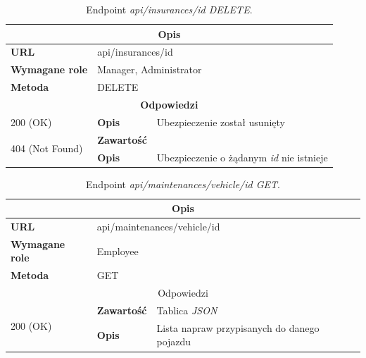 \documentclass[eng,printmode,openany]{mgr}
\begin{document}
\begin{table}[H]
	\caption{Endpoint \textit{api/insurances/id DELETE}.}
	\begin{tabularx}{\textwidth}{|l|l|X|}
		\hline
		\multicolumn{3}{|c|}{\textbf{\textbf{Opis}}}
		\\ \hline
		\textbf{URL}                       & \multicolumn{2}{l|}{api/insurances/id}
		\\ \hline
		\textbf{Wymagane role}             & \multicolumn{2}{l|}{Manager, Administrator}
		\\ \hline
		\textbf{Metoda}                    & \multicolumn{2}{l|}{DELETE}
		\\ \hline
		\multicolumn{3}{|c|}{\textbf{Odpowiedzi}}
		\\ \hline
		200 (OK)			                & \textbf{Opis}         	& Ubezpieczenie został usunięty
		\\ \hline
		\multirow{2}{*}{404 (Not Found)} 	& \textbf{Zawartość}     & 
		\\ \cline{2-3}                      & \textbf{Opis}          & Ubezpieczenie o żądanym \textit{id} nie istnieje
		\\ \hline
	\end{tabularx}
\end{table}

\begin{table}[H]
	\caption{Endpoint \textit{api/maintenances/vehicle/id GET}.}
	\begin{tabularx}{\textwidth}{|l|l|X|}
		\hline
		\multicolumn{3}{|c|}{\textbf{\textbf{Opis}}}
		\\ \hline
		\textbf{URL}                         & \multicolumn{2}{l|}{api/maintenances/vehicle/id}
		\\ \hline
		\textbf{Wymagane role}               & \multicolumn{2}{l|}{Employee}
		\\ \hline
		\textbf{Metoda}                      & \multicolumn{2}{l|}{GET}
		\\ \hline
		\multicolumn{3}{|c|}{ Odpowiedzi}
		\\ \hline
		\multirow{2}{*}{200 (OK)}   & \textbf{Zawartość}         & Tablica \textit{JSON}
		\\ \cline{2-3}              & \textbf{Opis}         	    & Lista napraw przypisanych do danego pojazdu
		\\ \hline
	\end{tabularx}
\end{table}
\end{document}
